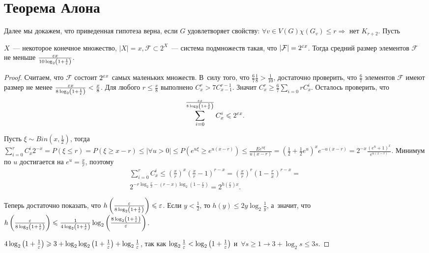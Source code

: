 \documentclass{article}
\begin{document}
\section{Теорема Алона}

Далее мы докажем, что приведенная гипотеза верна, если $G$ удовлетворяет
свойству: $\forall v \in V(G) \chi(G_v) \le r \Rightarrow $ нет $K_{r+2}$. Пусть

\begin{lemma}
	$X$~--- некоторое конечное множество, $|X| = x, \mathcal{F} \subset 2^X$~---
	система подмножеств такая, что $|\mathcal{F}| = 2^{\varepsilon x}$. Тогда средний
	размер элементов $\mathcal{F}$ не меньше $\frac{\varepsilon x}{10 \log_2 \left(1 +
	\frac{1}{\varepsilon}\right)}$.
\end{lemma}
\begin{proof}
	Считаем, что $\mathcal{F}$ состоит $2^{\varepsilon x}$ самых маленьких множеств.
	В~силу того, что $\frac{6}{7} \frac{1}{8} > \frac{1}{10}$, достаточно
	проверить, что $\frac{6}{7}$ элементов $\mathcal{F}$ имеют размер не менее
	$\frac{\varepsilon x}{8 \log_2 \left(1 + \frac{1}{\varepsilon}\right)} < \frac{x}{8}$. Для
	любого $r \le \frac{x}{8}$ выполнено $C_x^r > 7 C_{x-1}^{r-1}$. Значит $C_x^r
	\ge \frac{6}{7} \sum\limits_{i=0}{r} C_x^i$. Осталось проверить, что
	$$\sum\limits_{i=0}^\frac{\varepsilon x}{8 \log_2 \left( 1 + \frac{1}{\varepsilon}
	\right)} C_x^i \leqslant 2^{\varepsilon x}.$$

	Пусть $\xi \sim Bin(x, \frac{1}{2})$, тогда $\sum\limits_{i=0}^r C_x^i 2^{-x}
	= P(\xi \le r) = P(\xi \ge x - r) \le |\forall u > 0| \le P(e^{u\xi} \ge
	e^{u(x-r)}) \le \frac{Ee^{u\xi}}{u(x-r)} = \left( \frac{1}{2} + \frac{1}{2}e^u
	\right)^x e^{-u(x-r)} = 2^{-x} \frac{(e^u + 1)^x}{e^{u(x-r)}}$. Минимум по $u$
	достигается на $e^u = \frac{x}{r}$, поэтому
	\begin{multline*}
		\sum\limits_{i=0}^r C_x^i \le
		\left(\frac{x}{r}\right)^x \left( \frac{x}{r} - 1\right)^{r-x} = \left(
		\frac{x}{r}\right)^r \left(1 - \frac{r}{x}\right)^{r-x} =\\ 2^{-r \log_2
		\frac{r}{x} - (r-x) \log_2\left(1 - \frac{r}{x}\right)} =
		2^{h\left(\frac{r}{x}\right)x}.
	\end{multline*}

	Теперь достаточно показать, что $h\left( \frac{\varepsilon}{8 \log_2 \left(1 +
	\frac{1}{\varepsilon} \right)}\right) \leqslant \varepsilon$. Если $y < \frac{1}{2}$, то $h(y) \le
	2y \log_2 \frac{1}{y}$, а~значит, что $h\left( \frac{\varepsilon}{8 \log_2 \left(1 +
	\frac{1}{\varepsilon} \right)}\right) \leqslant \frac{1}{4 \log_2 \left(1 +
	\frac{1}{\varepsilon}\right)} \log_2 \left( \frac{8 \log_2 \left(1 + \frac{1}{\varepsilon}
	\right) }{\varepsilon}\right)$.

	$4 \log_2 \left(1 + \frac{1}{\varepsilon}\right) \geqslant 3 + \log_2 \log_2 \left( 1 +
	\frac{1}{\varepsilon} \right) + \log_2 \frac{1}{\varepsilon}$, так как $\log_2
	\frac{1}{\varepsilon} < \log_2 \left( 1 + \frac{1}{\varepsilon} \right)$ и~$\forall s \ge
	1 \rightarrow 3 + \log_2 s \le 3s$.
\end{proof}
\end{document}
